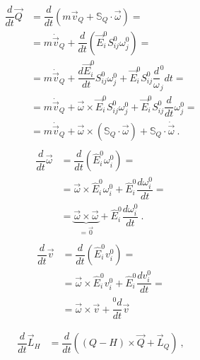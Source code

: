 \documentclass[letterpaper,10pt,english]{jupyterBook}
\begin{document}
\sphinxAtStartPar
{}
\begin{equation*}
\begin{split}\begin{aligned}
\dfrac{d}{dt} \vec{Q} 
  & = \dfrac{d}{dt} \left( m \vec{v}_Q + \mathbb{S}_Q \cdot \vec{\omega} \right) =  \\
  & =  m \dot{\vec{v}}_Q + \dfrac{d}{dt} \left( \vec{E}^0_i S^0_{ij} \omega^0_j \right) = \\
  & =  m \dot{\vec{v}}_Q + \dfrac{d\vec{E}^0_i }{dt} S^0_{ij} \omega^0_j + \vec{E}^0_i S^0_{ij} \dfrac{d} \omega^0_j{dt} = \\
  & =  m \dot{\vec{v}}_Q + \vec{\omega} \times \vec{E}^0_i S^0_{ij} \omega^0_j + \vec{E}^0_i S^0_{ij} \dfrac{d}{dt}\omega^0_j = \\
  & =  m \dot{\vec{v}}_Q + \vec{\omega} \times \left( \mathbb{S}_Q \cdot \vec{\omega} \right) + \mathbb{S}_Q \cdot \dot{\vec{\omega}} \ .
\end{aligned}\end{split}
\end{equation*}\begin{equation*}
\begin{split}\begin{aligned}
 \dfrac{d}{dt} \vec{\omega} 
 & = \dfrac{d}{dt} \left( \hat{E}^0_i \omega_i^0 \right) = \\
 & = \vec{\omega} \times \hat{E}^0_i \omega_i^0 + \hat{E}^0_i \dfrac{d \omega^0_i}{dt} = \\
 & = \underbrace{\vec{\omega} \times \vec{\omega}}_{=\vec{0}} + \hat{E}^0_i \dfrac{d \omega^0_i}{dt} \ .
\end{aligned}\end{split}
\end{equation*}\begin{equation*}
\begin{split}\begin{aligned}
 \dfrac{d}{dt} \vec{v} 
 & = \dfrac{d}{dt} \left( \hat{E}^0_i v_i^0 \right) = \\
 & = \vec{\omega} \times \hat{E}^0_i v_i^0 + \hat{E}^0_i \dfrac{d v^0_i}{dt} = \\
 & = \vec{\omega} \times \vec{v}  + \dfrac{{}^0 d}{dt} \vec{v} \\
\end{aligned}\end{split}
\end{equation*}
\sphinxAtStartPar
{}
\begin{equation*}
\begin{split}\begin{aligned}
\dfrac{d}{dt} \vec{L}_H
& =  \dfrac{d}{dt} \left( (Q-H) \times \vec{Q} + \vec{L}_Q  \right) \ ,
\end{aligned}\end{split}
\end{equation*}
\end{document}
